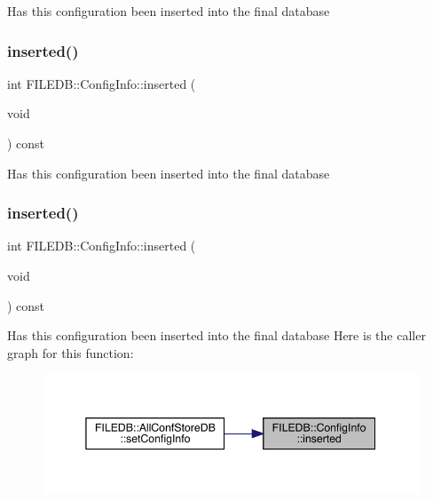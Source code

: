 Has this configuration been inserted into the final database \mbox{\label{classFILEDB_1_1ConfigInfo_a45cc2aa85de0ccd89c06989bb9cff843}} 
\subsubsection{\texorpdfstring{inserted()}{inserted()}\hspace{0.1cm}{\footnotesize\ttfamily [2/3]}}
{\footnotesize\ttfamily int F\+I\+L\+E\+D\+B\+::\+Config\+Info\+::inserted (\begin{DoxyParamCaption}\item[{void}]{ }\end{DoxyParamCaption}) const}

Has this configuration been inserted into the final database \mbox{\label{classFILEDB_1_1ConfigInfo_a45cc2aa85de0ccd89c06989bb9cff843}} 
\subsubsection{\texorpdfstring{inserted()}{inserted()}\hspace{0.1cm}{\footnotesize\ttfamily [3/3]}}
{\footnotesize\ttfamily int F\+I\+L\+E\+D\+B\+::\+Config\+Info\+::inserted (\begin{DoxyParamCaption}\item[{void}]{ }\end{DoxyParamCaption}) const}

Has this configuration been inserted into the final database Here is the caller graph for this function\+:
\nopagebreak
\begin{figure}[H]
\begin{center}
\leavevmode
\includegraphics[width=345pt]{d0/d90/classFILEDB_1_1ConfigInfo_a45cc2aa85de0ccd89c06989bb9cff843_icgraph}
\end{center}
\end{figure}
\mbox{\label{classFILEDB_1_1ConfigInfo_a03212f15d26edbae21ea53bbce2b1793}} 
